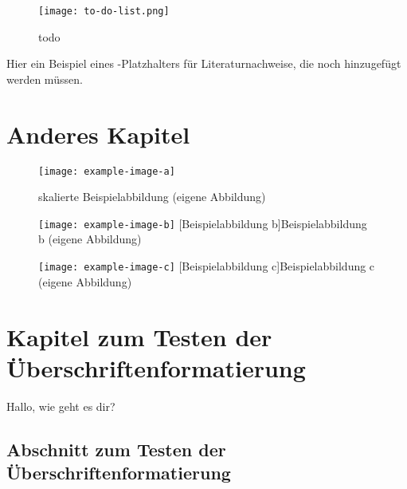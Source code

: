 \begin{figure}[!ht]
    \centering
    \texttt{[image: to-do-list.png]}
    \caption{todo}
    \label{fig:todo}
\end{figure}

\noindent Hier ein Beispiel eines \textcite{todo}-Platzhalters für Literaturnachweise, die noch hinzugefügt werden müssen.

\clearpage

\chapter{Anderes Kapitel}\label{chap:another}

\begin{figure}[!ht]
    \centering
    \texttt{[image: example-image-a]}
    \captionsetup{width=1.0\textwidth}
    \caption[skalierte Beispielabbildung]{skalierte Beispielabbildung (eigene Abbildung)}
    \label{fig:scaledexampleimagea}
\end{figure}

\begin{figure}[!ht]
\centering
    \begin{minipage}[c]{.475\textwidth}
    \centering
        \texttt{[image: example-image-b]}
        [Beispielabbildung b]{Beispielabbildung b (eigene Abbildung)}
        \label{fig:horizontalalignedimageb}
    \end{minipage}\hspace{.025\textwidth}
    \begin{minipage}[c]{.475\textwidth}
        \centering
        \texttt{[image: example-image-c]}
        [Beispielabbildung c]{Beispielabbildung c (eigene Abbildung)}
        \label{fig:horizontalalignedimagec}
    \end{minipage}
\end{figure}

\clearpage

\chapter{Kapitel zum Testen der Überschriftenformatierung}\label{chap:formattest}

Hallo, wie geht es dir?

\section{Abschnitt zum Testen der Überschriftenformatierung}\label{sec:formattest}

